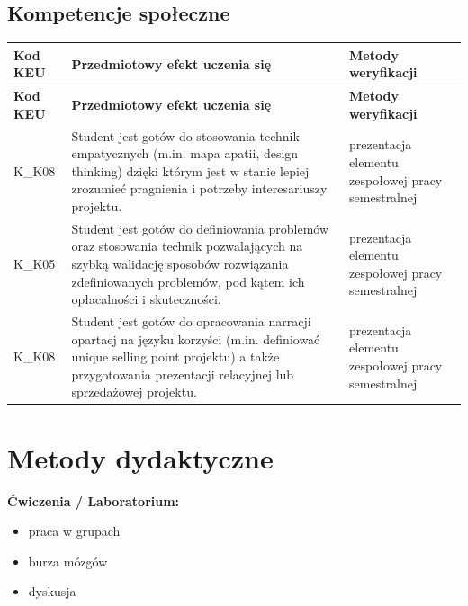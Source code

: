 \documentclass[12pt, a4paper]{article}
\newcommand{\thdrule}{\noalign{\global\setlength{\extrarowheight}{0pt}}}
\newcommand{\thdend}{\noalign{\global\setlength{\extrarowheight}{3pt}}}
\begin{document}
\subsection*{Kompetencje społeczne}
{\scriptsize
\begin{longtable}{m{1.6cm}m{9.0cm}m{4.2cm}}
\thdrule\toprule
\rowcolor{pjatkRed} {\color{white}\footnotesize\textbf{\vphantom{Ag}Kod KEU}} & {\color{white}\footnotesize\textbf{\vphantom{Ag}Przedmiotowy efekt uczenia się}} & {\color{white}\footnotesize\textbf{\vphantom{Ag}Metody weryfikacji}} \\
\midrule\thdend
\endfirsthead
\thdrule\toprule
\rowcolor{pjatkRed} {\color{white}\footnotesize\textbf{\vphantom{Ag}Kod KEU}} & {\color{white}\footnotesize\textbf{\vphantom{Ag}Przedmiotowy efekt uczenia się}} & {\color{white}\footnotesize\textbf{\vphantom{Ag}Metody weryfikacji}} \\
\midrule\thdend
\endhead
  \rowcolor{tableRowLight} K\_K08 & Student jest gotów do  stosowania technik empatycznych (m.in. mapa apatii, design thinking) dzięki którym jest w stanie lepiej zrozumieć pragnienia i potrzeby interesariuszy projektu. & prezentacja elementu zespołowej pracy semestralnej \\
  \rowcolor{tableRowAlt} K\_K05 & Student jest gotów do  definiowania problemów oraz stosowania technik pozwalających na szybką walidację sposobów rozwiązania zdefiniowanych problemów, pod kątem ich opłacalności i skuteczności. & prezentacja elementu zespołowej pracy semestralnej \\
  \rowcolor{tableRowLight} K\_K08 & Student jest gotów do  opracowania narracji opartaej na języku korzyści (m.in. definiować unique selling point projektu) a także przygotowania prezentacji relacyjnej lub sprzedażowej projektu. & prezentacja elementu zespołowej pracy semestralnej \\
\bottomrule
\end{longtable}}

\section{Metody dydaktyczne}

\textbf{Ćwiczenia / Laboratorium:}
\begin{itemize}
  \item praca w grupach
  \item burza mózgów
  \item dyskusja
\end{itemize}
\vspace{4pt}
\end{document}

